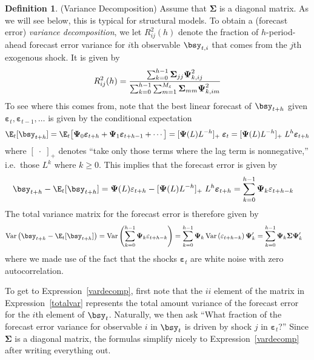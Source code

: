 \documentclass[12pt]{article}
\theoremstyle{plain}
\theoremstyle{definition}
\newtheorem{defn}[thm]{Definition}
\theoremstyle{remark}
\newcommand{\bsSigma}{\boldsymbol{\Sigma}}
\newcommand{\bsvarepsilon}{\boldsymbol{\varepsilon}}
\newcommand{\bsPsi}{\boldsymbol{\Psi}}
\newcommand{\Var}{\operatorname{Var}}
\begin{document}
\begin{defn}(Variance Decomposition)
Assume that $\bsSigma$ is a diagonal matrix. As we will see below, this
is typical for structural models.
To obtain a (forecast error) \emph{variance decomposition}, we let
$R^2_{ij}(h)$ denote the fraction of $h$-period-ahead forecast error
variance for $i$th observable $\bsy_{t,i}$ that comes from the $j$th
exogenous shock. It is given by
\begin{align}
  R^2_{ij}(h)
  =
  \frac{%
    \sum_{k=0}^{h-1}
    \bsSigma_{jj} \bsPsi_{k,ij}^2
  }{%
    \sum_{k=0}^{h-1} \sum_{m=1}^{M_\varepsilon}
    \bsSigma_{mm} \bsPsi_{k,im}^2
  }
  \label{vardecomp}
\end{align}
To see where this comes from, note that the best linear forecast of
$\bsy_{t+h}$ given $\bsvarepsilon_t,\bsvarepsilon_{t-1},\ldots$ is given
by the conditional expectation
\begin{align*}
  \E_t[\bsy_{t+h}]
  =
  \E_t\big[
    \bsPsi_0\bsvarepsilon_{t+h}
    + \bsPsi_1\bsvarepsilon_{t+h-1}
    + \cdots
  \big]
  = [\bsPsi(L)L^{-h}]_+\;\bsvarepsilon_t
  = [\bsPsi(L)L^{-h}]_+\;L^h\bsvarepsilon_{t+h}
\end{align*}
where $[\;\cdot\;]_+$ denotes ``take only those terms where the lag term
is nonnegative,'' i.e.\ those $L^k$ where $k\geq 0$.
This implies that the forecast error is given by
\begin{align*}
  \bsy_{t+h} - \E_t[\bsy_{t+h}]
  &=
  \bsPsi(L)\varepsilon_{t+h}
  - [\bsPsi(L)L^{-h}]_+\;L^h\bsvarepsilon_{t+h}
  =
  \sum_{k=0}^{h-1}
  \bsPsi_k \varepsilon_{t+h-k}
\end{align*}
The total variance matrix for the forecast error is therefore given by
\begin{align}
  \Var\big(
  \bsy_{t+h} - \E_t[\bsy_{t+h}]
  \big)
  &=
  \Var\left(
  \sum_{k=0}^{h-1}
  \bsPsi_k \varepsilon_{t+h-k}
  \right)
  =
  \sum_{k=0}^{h-1} \bsPsi_k \Var\left(
  \varepsilon_{t+h-k}
  \right)\bsPsi_k'
  =
  \sum_{k=0}^{h-1}
  \bsPsi_k\bsSigma \bsPsi_k'
  \label{totalvar}
\end{align}
where we made use of the fact that the shocks $\bsvarepsilon_t$ are
white noise with zero autocorrelation.

To get to Expression~\ref{vardecomp}, first note that the $ii$ element
of the matrix in Expression~\ref{totalvar} represents the total amount
variance of the forecast error for the $i$th element of $\bsy_t$.
Naturally, we then ask ``What fraction of the forecast error variance
for observable $i$ in $\bsy_t$ is driven by shock $j$ in
$\bsvarepsilon_t$?'' Since $\bsSigma$ is a diagonal matrix, the formulas
simplify nicely to Expression~\ref{vardecomp} after writing everything
out.
\end{defn}
\end{document}
